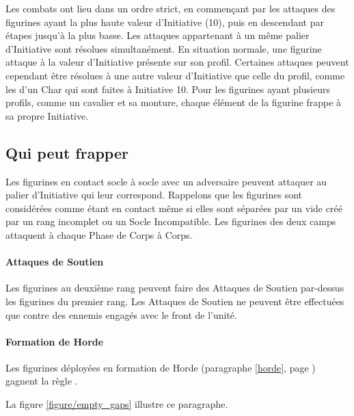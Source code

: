 \vspace*{0.5cm}
Les combats ont lieu dans un ordre strict, en commençant par les attaques des figurines ayant la plus haute valeur d'Initiative (10), puis en descendant par étapes jusqu'à la plus basse. Les attaques appartenant à un même palier d'Initiative sont résolues simultanément. En situation normale, une figurine attaque à la valeur d'Initiative présente sur son profil. Certaines attaques peuvent cependant être résolues à une autre valeur d'Initiative que celle du profil, comme les \impacthits{} d'un Char qui sont faites à Initiative 10. Pour les figurines ayant plusieurs profils, comme un cavalier et sa monture, chaque élément de la figurine frappe à sa propre Initiative.

\subsection{Qui peut frapper}

Les figurines en contact socle à socle avec un adversaire peuvent attaquer au palier d'Initiative qui leur correspond. Rappelons que les figurines sont considérées comme étant en contact même si elles sont séparées par un vide créé par un rang incomplet ou un Socle Incompatible. Les figurines des deux camps attaquent à chaque Phase de Corps à Corps.

\paragraph{Attaques de Soutien}

Les figurines au deuxième rang peuvent faire des Attaques de Soutien par-dessus les figurines du premier rang. Les Attaques de Soutien ne peuvent être effectuées que contre des ennemis engagés avec le front de l'unité.

\paragraph{Formation de Horde}

Les figurines déployées en formation de Horde (paragraphe \ref{horde}, page \pageref{horde}) gagnent la règle \fightinextrarank{}.

La figure \ref{figure/empty_gaps} illustre ce paragraphe.

